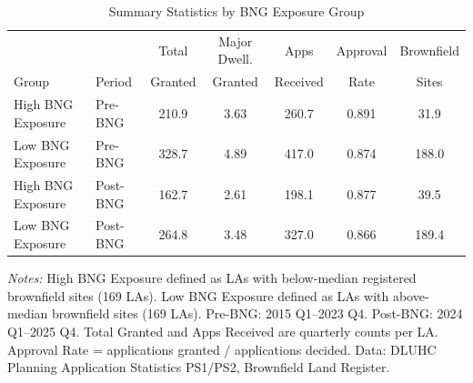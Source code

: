 \begin{table}[htbp]
\centering
\caption{Summary Statistics by BNG Exposure Group}
\label{tab:summary}
\footnotesize
\begin{tabular}{llccccc}
\hline\hline
 & & Total & Major Dwell. & Apps & Approval & Brownfield \\
Group & Period & Granted & Granted & Received & Rate & Sites \\
\hline
High BNG Exposure & Pre-BNG & 210.9 & 3.63 & 260.7 & 0.891 & 31.9 \\
Low BNG Exposure & Pre-BNG & 328.7 & 4.89 & 417.0 & 0.874 & 188.0 \\
\hline
High BNG Exposure & Post-BNG & 162.7 & 2.61 & 198.1 & 0.877 & 39.5 \\
Low BNG Exposure & Post-BNG & 264.8 & 3.48 & 327.0 & 0.866 & 189.4 \\
\hline\hline
\end{tabular}
\begin{tablenotes}[flushleft]\small
\item \textit{Notes:} High BNG Exposure defined as LAs with below-median registered brownfield sites (169 LAs). Low BNG Exposure defined as LAs with above-median brownfield sites (169 LAs). Pre-BNG: 2015 Q1--2023 Q4. Post-BNG: 2024 Q1--2025 Q4. Total Granted and Apps Received are quarterly counts per LA. Approval Rate = applications granted / applications decided. Data: DLUHC Planning Application Statistics PS1/PS2, Brownfield Land Register.
\end{tablenotes}
\end{table}

